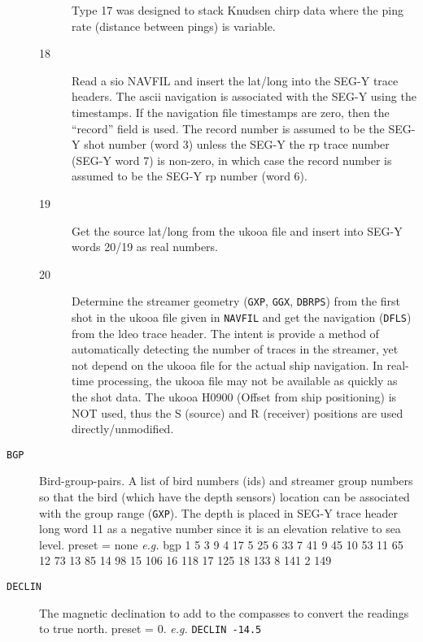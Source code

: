 \begin{description}
\begin{description}
         Type 17 was designed to stack Knudsen chirp data where the ping rate (distance between pings) is variable.

\item[18] Read a \gls{sio} NAVFIL and insert the lat/long into the SEG-Y trace
         headers.  The \gls{ascii} navigation is associated with the SEG-Y
         using the timestamps.  If the navigation file timestamps are
         zero, then the ``record'' field is used.  The record number is
         assumed to be the SEG-Y \gls{shot} number (word 3) unless the SEG-Y
         the \gls{rp} trace number (SEG-Y word 7) is non-zero, in which case
         the record number is assumed to be the SEG-Y \gls{rp} number (word 6).

\item[19] Get the source lat/long from the \gls{ukooa} file and insert into
         SEG-Y words 20/19 as real numbers.

\item[20] Determine the streamer geometry (\texttt{GXP}, \texttt{GGX}, \texttt{DBRPS}) from the first
         \gls{shot} in the \gls{ukooa} file given in \texttt{NAVFIL} and get the navigation
         (\texttt{DFLS}) from the \gls{ldeo} trace header.  The intent is provide a
         method of automatically detecting the number of traces in the
         streamer, yet not depend on the \gls{ukooa} file for the actual
         ship navigation.  In real-time processing, the \gls{ukooa} file may
         not be available as quickly as the \gls{shot} data.  The \gls{ukooa} H0900
         (Offset from ship positioning) is NOT used, thus the S (source)
         and R (receiver) positions are used directly/unmodified.
\end{description}

\item[\texttt{BGP}] Bird-group-pairs.  A list of bird numbers (ids) and streamer
         group numbers so that the bird (which have the depth sensors)
         location can be associated with the group range (\texttt{GXP}).  The
         depth is placed in SEG-Y trace header long word 11 as a
         negative number since it is an elevation relative to sea level.
         \Gls{preset} = none    \textit{e.g.} bgp 1 5 3 9 4 17 5 25 6 33 7 41 9 45 10 53
          11 65 12 73 13 85 14 98 15 106 16 118 17 125 18 133 8 141 2 149

\item[\texttt{DECLIN}] The magnetic declination to add to the compasses to convert
         the readings to true north.
         \Gls{preset} = 0.   \textit{e.g.}   \texttt{DECLIN -14.5}


\end{description}
